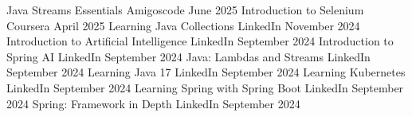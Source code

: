 \begin{cvhonors}
  \cvhonor
    {Java Streams Essentials} %
    {Amigoscode} %
    {} %
    {June 2025} %
  \cvhonor
    {Introduction to Selenium} %
    {Coursera} %
    {}
    {April 2025}
  \cvhonor
    {Learning Java Collections} %
    {LinkedIn} %
    {}
    {November 2024}
  \cvhonor
    {Introduction to Artificial Intelligence} %
    {LinkedIn} %
    {}
    {September 2024}
  \cvhonor
    {Introduction to Spring AI} %
    {LinkedIn} %
    {}
    {September 2024}
  \cvhonor
    {Java: Lambdas and Streams} %
    {LinkedIn} %
    {}
    {September 2024}
  \cvhonor
    {Learning Java 17} %
    {LinkedIn} %
    {}
    {September 2024}
  \cvhonor
    {Learning Kubernetes} %
    {LinkedIn} %
    {}
    {September 2024}
  \cvhonor
    {Learning Spring with Spring Boot} %
    {LinkedIn} %
    {}
    {September 2024}
  \cvhonor
    {Spring: Framework in Depth} %
    {LinkedIn} %
    {}
    {September 2024}
\end{cvhonors}
